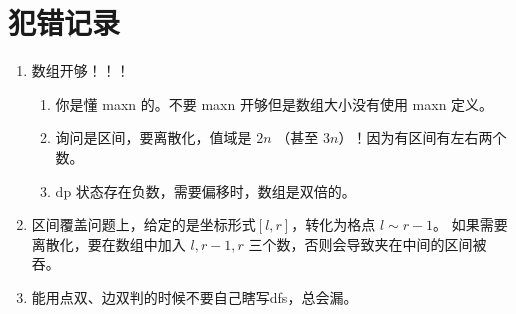 \documentclass[../template.tex]{subfiles}
\begin{document}
\section{犯错记录}
\begin{enumerate}
	\item 数组开够！！！
	      \begin{enumerate}
		      \item 你是懂 maxn 的。不要 maxn 开够但是数组大小没有使用 maxn 定义。
		      \item 询问是区间，要离散化，值域是 $2n$ （甚至 $3n$）！因为有区间有左右两个数。
		      \item dp 状态存在负数，需要偏移时，数组是双倍的。
	      \end{enumerate}

	\item 区间覆盖问题上，给定的是坐标形式$[l,r]$，转化为格点 $l\sim r-1$。
	      如果需要离散化，要在数组中加入 $l,r-1,r$ 三个数，否则会导致夹在中间的区间被吞。

	\item 能用点双、边双判的时候不要自己瞎写dfs，总会漏。

\end{enumerate}
\end{document}
